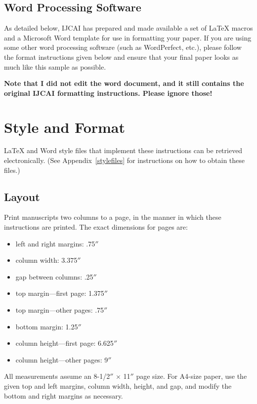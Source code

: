 \documentclass{article}
\begin{document}
\subsection{Word Processing Software}

As detailed below, IJCAI has prepared and made available a set of
\LaTeX{} macros and a Microsoft Word template for use in formatting
your paper. If you are using some other word processing software (such
as WordPerfect, etc.), please follow the format instructions given
below and ensure that your final paper looks as much like this sample
as possible.

{\bf Note that I did not edit the word document, and it still contains the original IJCAI formatting instructions. Please ignore those!}

\section{Style and Format}

\LaTeX{} and Word style files that implement these instructions
can be retrieved electronically. (See Appendix~\ref{stylefiles} for
instructions on how to obtain these files.)

\subsection{Layout}

Print manuscripts two columns to a page, in the manner in which these
instructions are printed. The exact dimensions for pages are:
\begin{itemize}
\item left and right margins: .75$''$
\item column width: 3.375$''$
\item gap between columns: .25$''$
\item top margin---first page: 1.375$''$
\item top margin---other pages: .75$''$
\item bottom margin: 1.25$''$
\item column height---first page: 6.625$''$
\item column height---other pages: 9$''$
\end{itemize}

All measurements assume an 8-1/2$''$ $\times$ 11$''$ page size. For
A4-size paper, use the given top and left margins, column width,
height, and gap, and modify the bottom and right margins as necessary.
\end{document}

